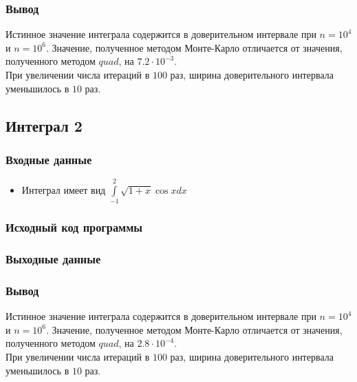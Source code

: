\documentclass{article}
\begin{document}
        \subsubsection{Вывод}
        Истинное значение интеграла содержится в доверительном интервале при $n = 10^4$ и $n = 10^6$. Значение, полученное методом Монте-Карло отличается от значения, полученного методом $quad$, на $7.2 \cdot 10^{-3}$.\\
        При увеличении числа итераций в $100$ раз, ширина доверительного интервала уменьшилось в $10$ раз.
    \subsection{Интеграл 2}
        \subsubsection{Входные данные}
            \begin{itemize}
                \item Интеграл имеет вид ${\displaystyle \int\limits_{-1}^{2} \sqrt{1 + x} \cos x dx}$
            \end{itemize}
        \subsubsection{Исходный код программы}
        \begin{minipage}{\linewidth}
            
        \end{minipage}
        \subsubsection{Выходные данные}
        \begin{minipage}{\linewidth}
            
        \end{minipage}
        \subsubsection{Вывод}
        Истинное значение интеграла содержится в доверительном интервале при $n = 10^4$ и $n = 10^6$. Значение, полученное методом Монте-Карло отличается от значения, полученного методом $quad$, на $2.8 \cdot 10^{-4}$.\\
        При увеличении числа итераций в $100$ раз, ширина доверительного интервала уменьшилось в $10$ раз.
\end{document}
